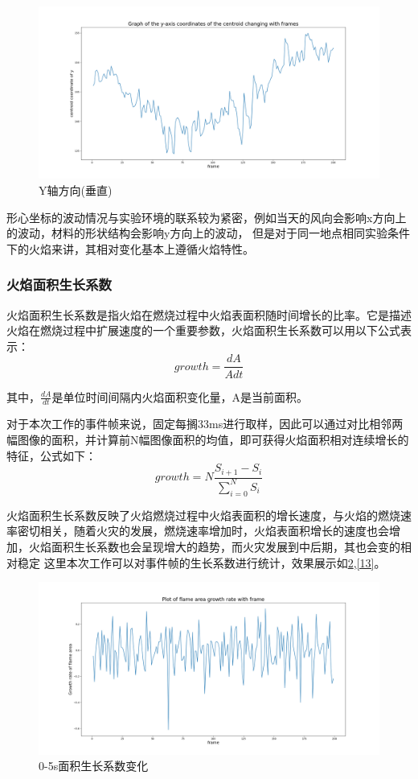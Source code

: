 \begin{figure}[ht]
    \centering
    \includegraphics[width=\textwidth]{figures/extract_centroid_y.png}
    \caption{Y轴方向(垂直)}
    \label{11}
\end{figure}

形心坐标的波动情况与实验环境的联系较为紧密，例如当天的风向会影响x方向上的波动，材料的形状结构会影响y方向上的波动，
但是对于同一地点相同实验条件下的火焰来讲，其相对变化基本上遵循火焰特性。

\subsubsection{火焰面积生长系数}
火焰面积生长系数是指火焰在燃烧过程中火焰表面积随时间增长的比率。它是描述火焰在燃烧过程中扩展速度的一个重要参数，火焰面积生长系数可以用以下公式表示：
\begin{equation} 
    growth=\frac{dA}{Adt}
\end{equation}

其中，$\frac{dA}{dt}$是单位时间间隔内火焰面积变化量，A是当前面积。

对于本次工作的事件帧来说，固定每搁33ms进行取样，因此可以通过对比相邻两幅图像的面积，并计算前N幅图像面积的均值，即可获得火焰面积相对连续增长的特征，公式如下：
\begin{equation} 
    growth=N\frac{S_{i+1}-S_i}{\sum_{i=0}^{N}S_i}
\end{equation}

火焰面积生长系数反映了火焰燃烧过程中火焰表面积的增长速度，与火焰的燃烧速率密切相关，随着火灾的发展，燃烧速率增加时，火焰表面积增长的速度也会增加，火焰面积生长系数也会呈现增大的趋势，而火灾发展到中后期，其也会变的相对稳定
这里本次工作可以对事件帧的生长系数进行统计，效果展示如\ref{12},\ref{13}。
\begin{figure}[ht]
    \centering
    \includegraphics[width=\textwidth]{figures/extract_area_01.png}
    \caption{0-5s面积生长系数变化}
    \label{12}
\end{figure}

